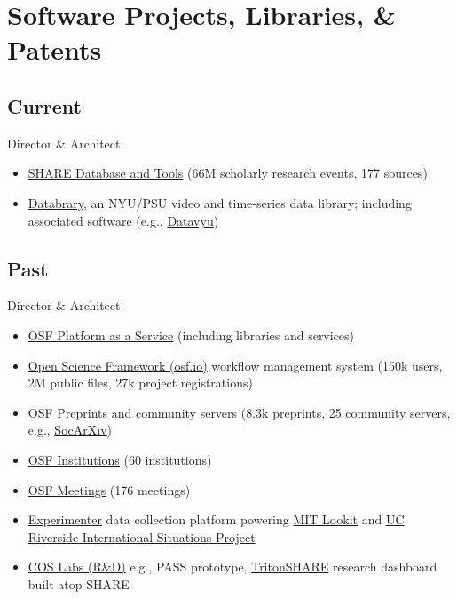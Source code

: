 \documentclass[11pt]{article}
\begin{document}
\begin{publications}
\end{publications}

\section*{Software Projects, Libraries, \& Patents}

\subsection{Current}
Director \& Architect:
\begin{itemize}
	\item \href{http://share.osf.io}{SHARE Database and Tools} (66M scholarly research events, 177 sources)
	\item \href{http://databrary.org}{Databrary}, an NYU/PSU video and time-series data library; including associated software (e.g., \href{http://datavyu.org}{Datavyu})
\end{itemize}

\subsection{Past}
Director \& Architect:
\begin{itemize}
  \item \href{http://github.com/CenterForOpenScience/}{OSF Platform as a Service} (including libraries and services)
  \item \href{http://osf.io}{Open Science Framework (osf.io)} workflow management system (150k users, 2M public files, 27k project registrations)
  \item \href{http://osf.io/preprints}{OSF Preprints} and community servers (8.3k preprints, 25 community servers, e.g., \href{http://osf.io/preprints/socarxiv}{SocArXiv})
  \item \href{https://cos.io/our-products/osf-institutions/}{OSF Institutions} (60 institutions)
  \item \href{https://cos.io/our-products/osf-meetings/}{OSF Meetings} (176 meetings)
  \item \href{https://github.com/CenterForOpenScience/experimenter}{Experimenter} data collection platform powering \href{https://lookit.mit.edu/}{MIT Lookit} and \href{http://www.internationalsituationsproject.com/}{UC Riverside International Situations Project}
  \item \href{http://github.com/cos-labs/}{COS Labs (R\&D)} e.g., PASS prototype, \href{http://tritonshare.ucsd.edu.com/cos-labs/}{TritonSHARE} research dashboard built atop SHARE
\end{itemize}
	
\end{document}
